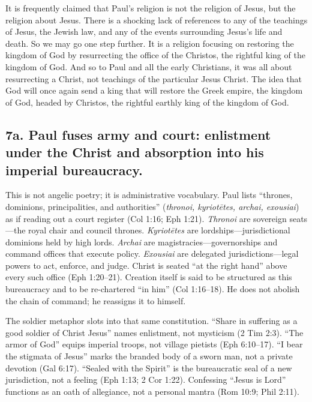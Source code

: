 It is frequently claimed that Paul's religion is not the religion of Jesus, but the religion about Jesus.
There is a shocking lack of references to any of the teachings of Jesus, the Jewish law, and any of the events surrounding Jesus's life and death.
So we may go one step further.
It is a religion focusing on restoring the kingdom of God by resurrecting the office of the Christos, the rightful king of the kingdom of God.
And so to Paul and all the early Christians, it was all about resurrecting a Christ, not teachings of the particular Jesus Christ.
The idea that God will once again send a king that will restore the Greek empire, the kingdom of God, headed by Christos, the rightful earthly king of the kingdom of God.

\subsection{7a.
Paul fuses army and court: enlistment under the Christ and absorption into his imperial bureaucracy.}\label{subsec:pau-fuses-army-and-court-enlistment-under-the-christ-and-absorption-into-his-imperial-bureaucracy.}

This is not angelic poetry; it is administrative vocabulary.
Paul lists “thrones, dominions, principalities, and authorities” (\emph{thronoi, kyriotētes, archai, exousiai}) as if reading out a court register (Col 1:16; Eph 1:21).
\emph{Thronoi} are sovereign seats—the royal chair and council thrones.
\emph{Kyriotētes} are lordships—jurisdictional dominions held by high lords.
\emph{Archai} are magistracies—governorships and command offices that execute policy.
\emph{Exousiai} are delegated jurisdictions—legal powers to act, enforce, and judge.
Christ is seated “at the right hand” above every such office (Eph 1:20–21).
Creation itself is said to be structured as this bureaucracy and to be re-chartered “in him” (Col 1:16–18).
He does not abolish the chain of command; he reassigns it to himself.

The soldier metaphor slots into that same constitution.
“Share in suffering as a good soldier of Christ Jesus” names enlistment, not mysticism (2 Tim 2:3).
“The armor of God” equips imperial troops, not village pietists (Eph 6:10–17).
“I bear the stigmata of Jesus” marks the branded body of a sworn man, not a private devotion (Gal 6:17).
“Sealed with the Spirit” is the bureaucratic seal of a new jurisdiction, not a feeling (Eph 1:13; 2 Cor 1:22).
Confessing “Jesus is Lord” functions as an oath of allegiance, not a personal mantra (Rom 10:9; Phil 2:11).

